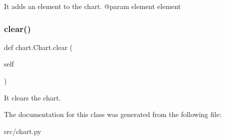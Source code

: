 \begin{DoxyVerb}It adds an element to the chart.
    @param element    element
\end{DoxyVerb}
 \mbox{\label{classchart_1_1_chart_a7152e6fb3985fdd1328c0a4ef3fd9322}} 
\subsubsection{\texorpdfstring{clear()}{clear()}}
{\footnotesize\ttfamily def chart.\+Chart.\+clear (\begin{DoxyParamCaption}\item[{}]{self }\end{DoxyParamCaption})}

\begin{DoxyVerb}It clears the chart.\end{DoxyVerb}
 

The documentation for this class was generated from the following file\+:\begin{DoxyCompactItemize}
\item 
src/chart.\+py\end{DoxyCompactItemize}
